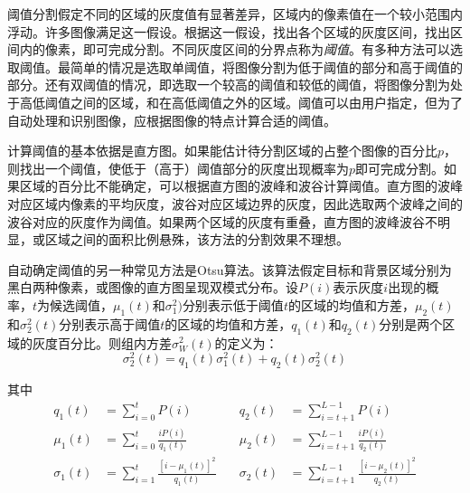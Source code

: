 阈值分割假定不同的区域的灰度值有显著差异，区域内的像素值在一个较小范围内浮动。许多图像满足这一假设。根据这一假设，找出各个区域的灰度区间，找出区间内的像素，即可完成分割。不同灰度区间的分界点称为\emph{阈值}。有多种方法可以选取阈值。最简单的情况是选取单阈值，将图像分割为低于阈值的部分和高于阈值的部分。还有双阈值的情况，即选取一个较高的阈值和较低的阈值，将图像分割为处于高低阈值之间的区域，和在高低阈值之外的区域。阈值可以由用户指定，但为了自动处理和识别图像，应根据图像的特点计算合适的阈值。

计算阈值的基本依据是直方图。如果能估计待分割区域的占整个图像的百分比$p$，则找出一个阈值，使低于（高于）阈值部分的灰度出现概率为$p$即可完成分割。如果区域的百分比不能确定，可以根据直方图的波峰和波谷计算阈值。直方图的波峰对应区域内像素的平均灰度，波谷对应区域边界的灰度，因此选取两个波峰之间的波谷对应的灰度作为阈值。如果两个区域的灰度有重叠，直方图的波峰波谷不明显，或区域之间的面积比例悬殊，该方法的分割效果不理想。

自动确定阈值的另一种常见方法是Otsu算法。该算法假定目标和背景区域分别为黑白两种像素，或图像的直方图呈现双模式分布。设$P(i)$表示灰度$i$出现的概率，$t$为候选阈值，$\mu_1(t)$和$\sigma_1^2)$分别表示低于阈值$t$的区域的均值和方差，$\mu_2(t)$和$\sigma_2^2(t)$分别表示高于阈值$t$的区域的均值和方差，$q_1(t)$和$q_2(t)$分别是两个区域的灰度百分比。则组内方差$\sigma_W^2(t)$的定义为：
\begin{equation}
  \label{eq:sigw}
  \sigma_2^2(t)=q_1(t)\sigma_1^2(t)+q_2(t)\sigma_2^2(t)
\end{equation}

其中
\begin{equation}
  \label{eq:musig}
  \begin{aligned}
    q_1(t) &= \sum_{i=0}^tP(i) \quad & q_2(t) &= \sum_{i=t+1}^{L-1}P(i) \\
    \mu_1(t) &= \sum_{i=0}^t\frac{iP(i)}{q_1(t)} \quad & \mu_2(t) &= \sum_{i=t+1}^{L-1}\frac{iP(i)}{q_2(t)} \\
    \sigma_1(t) &= \sum_{i=1}^t\frac{[i-\mu_1(t)]^2}{q_1(t)} \quad & \sigma_2(t) &= \sum_{i=t+1}^{L-1}\frac{[i-\mu_2(t)]^2}{q_2(t)}
  \end{aligned}
\end{equation}

